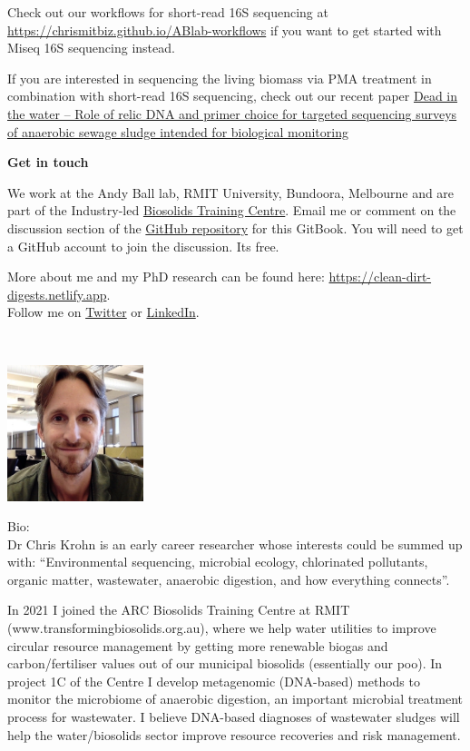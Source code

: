 \documentclass[
]{book}
\begin{document}
Check out our workflows for short-read 16S sequencing at \url{https://chrismitbiz.github.io/ABlab-workflows} if you want to get started with Miseq 16S sequencing instead.

If you are interested in sequencing the living biomass via PMA treatment in combination with short-read 16S sequencing, check out our recent paper \href{https://doi.org/10.1016/j.watres.2024.121354}{Dead in the water -- Role of relic DNA and primer choice for targeted sequencing surveys of anaerobic sewage sludge intended for biological monitoring} \citep{Krohn2024}

\textbf{Get in touch}

We work at the Andy Ball lab, RMIT University, Bundoora, Melbourne and are part of the Industry-led \href{https://www.transformingbiosolids.org.au}{Biosolids Training Centre}. Email me or comment on the discussion section of the \href{https://github.com/chrismitbiz/ABlab-workflows/discussions/}{GitHub repository} for this GitBook. You will need to get a GitHub account to join the discussion. Its free.

More about me and my PhD research can be found here: \url{https://clean-dirt-digests.netlify.app}.\\
Follow me on \href{https://twitter.com/CleanDirtChris}{Twitter} or \href{https://www.linkedin.com/in/christian-krohn-54904855}{LinkedIn}.

~

\includegraphics[width=1.5625in,height=\textheight]{./img/avatar.jpg}

Bio:\\
Dr Chris Krohn is an early career researcher whose interests could be summed up with: ``Environmental sequencing, microbial ecology, chlorinated pollutants, organic matter, wastewater, anaerobic digestion, and how everything connects''.

In 2021 I joined the ARC Biosolids Training Centre at RMIT (www.transformingbiosolids.org.au), where we help water utilities to improve circular resource management by getting more renewable biogas and carbon/fertiliser values out of our municipal biosolids (essentially our poo). In project 1C of the Centre I develop metagenomic (DNA-based) methods to monitor the microbiome of anaerobic digestion, an important microbial treatment process for wastewater. I believe DNA-based diagnoses of wastewater sludges will help the water/biosolids sector improve resource recoveries and risk management.
\end{document}
